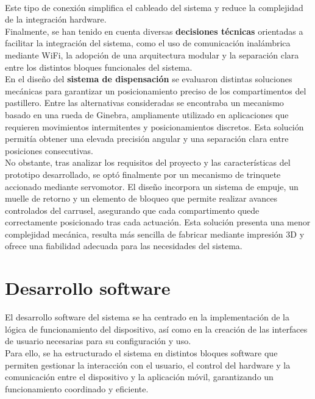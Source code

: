\

Este tipo de conexión simplifica el cableado del sistema y reduce la complejidad de la integración hardware.\\

Finalmente, se han tenido en cuenta diversas \textbf{decisiones técnicas} orientadas a facilitar la integración del sistema, como el uso de comunicación inalámbrica mediante WiFi, la adopción de una arquitectura modular y la separación clara entre los distintos bloques funcionales del sistema.\\


En el diseño del \textbf{sistema de dispensación} se evaluaron distintas soluciones mecánicas para garantizar un posicionamiento preciso de los compartimentos del pastillero. Entre las alternativas consideradas se encontraba un mecanismo basado en una rueda de Ginebra, ampliamente utilizado en aplicaciones que requieren movimientos intermitentes y posicionamientos discretos. Esta solución permitía obtener una elevada precisión angular y una separación clara entre posiciones consecutivas.\\

No obstante, tras analizar los requisitos del proyecto y las características del prototipo desarrollado, se optó finalmente por un mecanismo de trinquete accionado mediante servomotor. El diseño incorpora un sistema de empuje, un muelle de retorno y un elemento de bloqueo que permite realizar avances controlados del carrusel, asegurando que cada compartimento quede correctamente posicionado tras cada actuación. Esta solución presenta una menor complejidad mecánica, resulta más sencilla de fabricar mediante impresión 3D y ofrece una fiabilidad adecuada para las necesidades del sistema.


\section{Desarrollo software}
\label{sec:desarrollo_software}

El desarrollo software del sistema se ha centrado en la implementación de la lógica de funcionamiento del dispositivo, así como en la creación de las interfaces de usuario necesarias para su configuración y uso.\\

Para ello, se ha estructurado el sistema en distintos bloques software que permiten gestionar la interacción con el usuario, el control del hardware y la comunicación entre el dispositivo y la aplicación móvil, garantizando un funcionamiento coordinado y eficiente.

